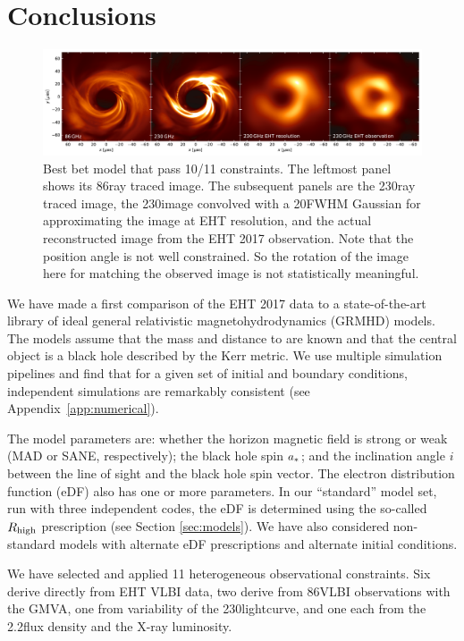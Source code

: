 \section{Conclusions}
\label{sec:conclusions}

\begin{figure}
  \centering
  \includegraphics[width=\textwidth]{figures/bestbet_imgs.pdf}
  \caption{Best bet model that pass 10/11 constraints.
    The leftmost panel shows its 86\GHz ray traced image.
    The subsequent panels are the 230\GHz ray traced image,
    the 230\GHz image convolved with a 20\uas FWHM Gaussian for approximating the image at EHT resolution, and
    the actual reconstructed image from the EHT 2017 observation.
    Note that the position angle is not well constrained.
    So the rotation of the image here for matching the observed image is not statistically meaningful.}
  \label{fig:bestbet_imgs}
\end{figure}

We have made a first comparison of the EHT 2017 \sgra data to a state-of-the-art library of ideal general relativistic magnetohydrodynamics (GRMHD) models.  The models assume that the mass and distance to \sgra are known and that the central object is a black hole described by the Kerr metric.  We use multiple simulation pipelines and find that for a given set of initial and boundary conditions, independent simulations are remarkably consistent (see Appendix~\ref{app:numerical}).

The model parameters are: whether the horizon magnetic field is strong or weak (MAD or SANE, respectively); the black hole spin $a_*$; and the inclination angle $i$ between the line of sight and the black hole spin vector.  The electron distribution function (eDF) also has one or more parameters.  In our ``standard'' model set, run with three independent codes, the eDF is determined using the so-called $R_\mathrm{high}$ prescription (see Section \ref{sec:models}).  We have also considered non-standard models with alternate eDF prescriptions and alternate initial conditions.

We have selected and applied 11 heterogeneous observational constraints.  Six derive directly from EHT VLBI data, two derive from 86\GHz VLBI observations with the GMVA, one from variability of the 230\GHz lightcurve, and one each from the 2.2\um flux density and the X-ray luminosity.

